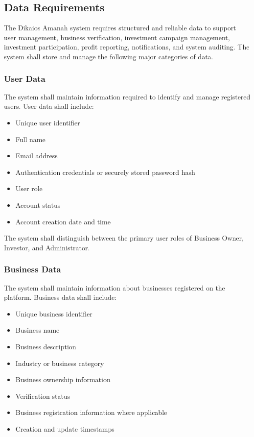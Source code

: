 \subsection{Data Requirements}

The Dikaios Amanah system requires structured and reliable data to support
user management, business verification, investment campaign management,
investment participation, profit reporting, notifications, and system
auditing. The system shall store and manage the following major categories
of data.

\subsubsection{User Data}

The system shall maintain information required to identify and manage
registered users. User data shall include:

\begin{itemize}
    \item Unique user identifier
    \item Full name
    \item Email address
    \item Authentication credentials or securely stored password hash
    \item User role
    \item Account status
    \item Account creation date and time
\end{itemize}

The system shall distinguish between the primary user roles of Business
Owner, Investor, and Administrator.

\subsubsection{Business Data}

The system shall maintain information about businesses registered on the
platform. Business data shall include:

\begin{itemize}
    \item Unique business identifier
    \item Business name
    \item Business description
    \item Industry or business category
    \item Business ownership information
    \item Verification status
    \item Business registration information where applicable
    \item Creation and update timestamps
\end{itemize}

